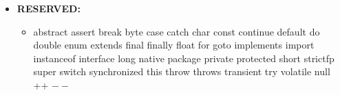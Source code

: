 \documentclass[12pt]{article}
\begin{document}
	         \begin{itemize} 
	        \item \textbf{RESERVED:}
	       	            \begin{itemize}
	       	                \item abstract
	       	                \text{\textbar} assert 
	       	                \text{\textbar} break 
	       	                \text{\textbar} byte 
	       	                \text{\textbar} case 
	       	                \text{\textbar} catch 
	       	                \text{\textbar} char 
	       	                \text{\textbar} const 
	       	                \text{\textbar} continue
	       	                 \text{\textbar} default 
	       	                 \text{\textbar} do 
	       	                 \text{\textbar} double
	       	                 \text{\textbar} enum 
	       	                 \text{\textbar} extends 
	       	                 \text{\textbar} final 
	       	                 \text{\textbar} finally 
	       	                 \text{\textbar} float 
	       	                 \text{\textbar} for 
	       	                 \text{\textbar} goto 
	       	                 \text{\textbar} implements 
	       	                 \text{\textbar} import 
	       	                 \text{\textbar} instanceof
	       	                 \text{\textbar} interface 
	       	                 \text{\textbar} long
	       	                 \text{\textbar} native
	       	                 \text{\textbar} package
	       	                 \text{\textbar} private 
	       	                 \text{\textbar} protected 
	       	                 \text{\textbar} short 
	       	                 \text{\textbar} strictfp
	       	                 \text{\textbar} super 
	       	                 \text{\textbar} switch 
	       	                 \text{\textbar} synchronized 
	       	                 \text{\textbar} this 
	       	                 \text{\textbar} throw 
	       	                 \text{\textbar} throws 
	       	                 \text{\textbar} transient 
	       	                 \text{\textbar} try
	       	                 \text{\textbar} volatile
		       	             \text{\textbar} null
	       	                 \text{\textbar} ++
	       	                 \text{\textbar} $--$
	       	            \end{itemize}      	 
		\end{itemize}
		
\end{document}
